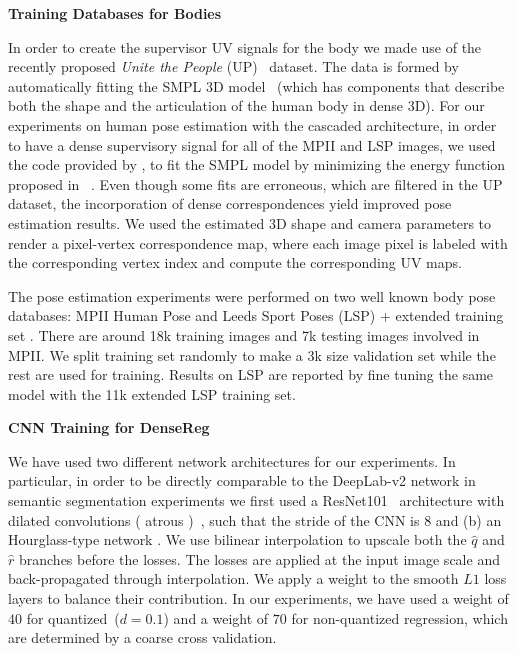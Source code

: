 \textbf{Training Databases for Bodies}
 
 In order to create the supervisor UV signals for the body we made use of the recently proposed \textit{Unite the People} (UP)~\citep{lassner2017unite} dataset. The data is formed by automatically fitting the SMPL 3D model~\citep{loper2015smpl} (which has components that describe both the shape and the articulation of the human body in dense 3D). 
 For our experiments on human pose estimation with the cascaded architecture, in order to have a dense supervisory signal for all of the MPII and LSP images, we used the code provided by \citep{lassner2017unite}, to fit the SMPL model by minimizing the energy function proposed in ~\citep{bogo2016keep}. Even though some fits are erroneous, which are filtered in the UP dataset, the incorporation of dense correspondences yield improved pose estimation results. We used the estimated 3D shape and camera parameters to render a pixel-vertex correspondence map, where each image pixel is labeled with the corresponding vertex index and compute the corresponding UV maps. 
 
 The pose estimation experiments were performed on two well known body pose databases: MPII Human Pose \citep{andriluka20142d} and Leeds Sport Poses (LSP) + extended training set \citep{Johnson10}. There are around 18k training images and 7k testing images involved in MPII. We split training set randomly to make a 3k size validation set while the rest are used for training. Results on LSP are reported by fine tuning the same model with the 11k extended LSP training set.

\textbf{CNN Training for DenseReg} 

We have used two different network architectures for our experiments. In particular, in order to be directly comparable to the DeepLab-v2 network in semantic segmentation experiments we first used a ResNet101~\citep{He2015} architecture with dilated convolutions ( atrous )~\citep{CP2015Semantic,mallat1999wavelet}, such that the stride of the CNN is $8$ and (b) an Hourglass-type network \cite{newell2016stacked}. We use bilinear interpolation to upscale both the $\hat{q}$ and $\hat{r}$ branches before the losses. The losses are applied at the input image scale and back-propagated through interpolation. We apply a weight to the smooth $L1$ loss layers to balance their contribution. In our experiments, we have used a weight of $40$ for quantized~($d=0.1$) and a weight of $70$ for non-quantized regression, which are determined by a coarse cross validation. 

